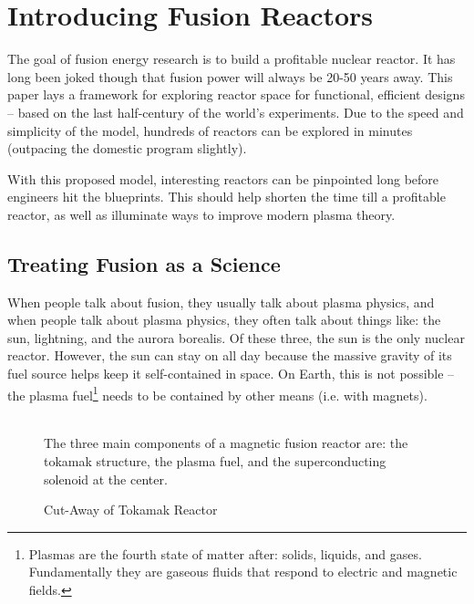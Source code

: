 %
%
%
%
%
%
%
%

\chapter{Introducing Fusion Reactors}

The goal of fusion energy research is to build a profitable nuclear reactor. It has long been joked though that fusion power will always be 20-50 years away. This paper lays a framework for exploring reactor space for functional, efficient designs -- based on the last half-century of the world's experiments. Due to the speed and simplicity of the model, hundreds of reactors can be explored in minutes (outpacing the domestic program slightly).

With this proposed model, interesting reactors can be pinpointed long before engineers hit the blueprints. This should help shorten the time till a profitable reactor, as well as illuminate ways to improve modern plasma theory.

\section{Treating Fusion  as a Science}

When people talk about fusion, they usually talk about plasma physics, and when people talk about plasma physics, they often talk about things like: the sun, lightning, and the aurora borealis. Of these three, the sun is the only nuclear reactor. However, the sun can stay on all day because the massive gravity of its fuel source helps keep it self-contained in space. On Earth, this is not possible -- the plasma fuel\footnote{Plasmas are the fourth state of matter after: solids, liquids, and gases. Fundamentally they are gaseous fluids that respond to electric and magnetic fields.} needs to be contained by other means (i.e. with magnets).

\begin{figure}
	\centering
	\begin{adjustbox}{width=0.75\textwidth}
		
	\end{adjustbox}
	\caption{Cut-Away of Tokamak Reactor} ~\\
	\small The three main components of a magnetic fusion reactor are: the tokamak structure, the plasma fuel, and the superconducting solenoid at the center.
\end{figure}

